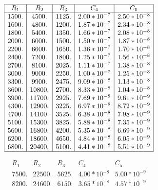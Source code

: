 \documentclass{llncs}
\begin{document}
	\begin{table}[!h]
          \begin{minipage}{0.5\textwidth}
		$$
		\begin{array}{|c|c|c|c|c|}
		\hline
		R_1    & R_2  & R_3   & C_4                          & C_5 \\
		\hline
		1500. & 4500. & 1125. & 2.00*10^{-7} & 2.50*10^{-8} \\
		1600. & 4800. & 1200. & 1.87*10^{-7} & 2.34*10^{-8} \\
		1800. & 5400. & 1350. & 1.66*10^{-7} & 2.08*10^{-8} \\
		2000. & 6000. & 1500. & 1.50*10^{-7} & 1.87*10^{-8} \\
		2200. & 6600. & 1650. & 1.36*10^{-7} & 1.70*10^{-8} \\
		2400. & 7200. & 1800.     & 1.25*10^{-7} & 1.56*10^{-8} \\
		2700. & 8100. & 2025.     & 1.11*10^{-7} & 1.38*10^{-8} \\
		3000. & 9000. & 2250.     & 1.00*10^{-7} & 1.25*10^{-8} \\
		3300. & 9900. & 2475.     & 9.09*10^{-8} & 1.13*10^{-8} \\
		3600. & 10800. & 2700.    & 8.33*10^{-8} & 1.04*10^{-8} \\
		3900. & 11700. & 2925.    & 7.69*10^{-8} & 9.61*10^{-9} \\
		4300. & 12900. & 3225.    & 6.97*10^{-8} & 8.72*10^{-9} \\
		4700. & 14100. & 3525.    & 6.38*10^{-8} & 7.98*10^{-9} \\
		5100. & 15300. & 3825.    & 5.88*10^{-8} & 7.35*10^{-9} \\
		5600. & 16800. & 4200.    & 5.35*10^{-8} & 6.69*10^{-9} \\
		6200. & 18600. & 4650.    & 4.84*10^{-8} & 6.05*10^{-9} \\
		6800. & 20400. & 5100.    & 4.41*10^{-8} & 5.51*10^{-9} \\
		\hline
		\end{array}
		$$
                \end{minipage} \hfill
          \begin{minipage}{0.5\textwidth}
		$$
		\begin{array}{|c|c|c|c|c|}
		\hline
		R_1    & R_2  & R_3   & C_4                          & C_5 \\
		\hline
		7500. & 22500. & 5625.    & 4.00*10^{-8} & 5.00*10^{-9} \\
		8200. & 24600. & 6150.    & 3.65*10^{-8} & 4.57*10^{-9} \\

\end{array}$$
\end{minipage}
\end{table}
\end{document}
